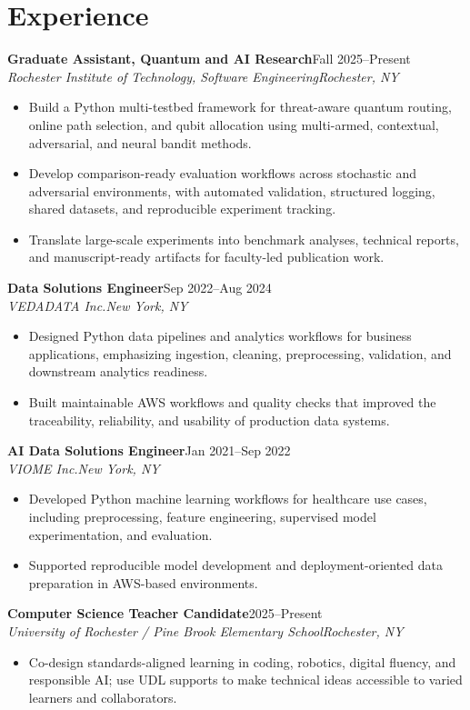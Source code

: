 \documentclass[10pt,letterpaper]{article}
\newcommand{\role}[4]{%
  \textbf{#1}\hfill #2\\
  \textit{#3}\hfill \textit{#4}\vspace{-3pt}
}
\begin{document}
\section*{Experience}
\role{Graduate Assistant, Quantum and AI Research}{Fall 2025--Present}
{Rochester Institute of Technology, Software Engineering}{Rochester, NY}
\begin{itemize}
  \item Build a Python multi-testbed framework for threat-aware quantum routing,
    online path selection, and qubit allocation using multi-armed, contextual,
    adversarial, and neural bandit methods.
  \item Develop comparison-ready evaluation workflows across stochastic and
    adversarial environments, with automated validation, structured logging,
    shared datasets, and reproducible experiment tracking.
  \item Translate large-scale experiments into benchmark analyses, technical
    reports, and manuscript-ready artifacts for faculty-led publication work.
\end{itemize}

\role{Data Solutions Engineer}{Sep 2022--Aug 2024}
{VEDADATA Inc.}{New York, NY}
\begin{itemize}
  \item Designed Python data pipelines and analytics workflows for business
    applications, emphasizing ingestion, cleaning, preprocessing, validation,
    and downstream analytics readiness.
  \item Built maintainable AWS workflows and quality checks that improved the
    traceability, reliability, and usability of production data systems.
\end{itemize}

\role{AI Data Solutions Engineer}{Jan 2021--Sep 2022}
{VIOME Inc.}{New York, NY}
\begin{itemize}
  \item Developed Python machine learning workflows for healthcare use cases,
    including preprocessing, feature engineering, supervised model
    experimentation, and evaluation.
  \item Supported reproducible model development and deployment-oriented data
    preparation in AWS-based environments.
\end{itemize}

\role{Computer Science Teacher Candidate}{2025--Present}
{University of Rochester / Pine Brook Elementary School}{Rochester, NY}
\begin{itemize}
  \item Co-design standards-aligned learning in coding, robotics, digital
    fluency, and responsible AI; use UDL supports to make technical ideas
    accessible to varied learners and collaborators.
\end{itemize}
\end{document}
